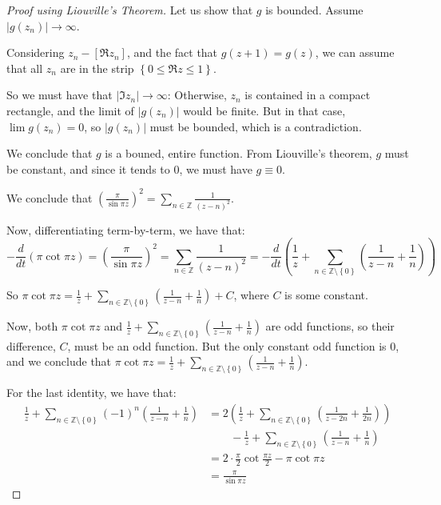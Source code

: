 \documentclass[11pt]{article} %
\theoremstyle{definition}
\theoremstyle{remark}
\newcommand{\abs}[1]{\left|#1\right|}
\begin{document}
\begin{proof}[Proof using Liouville's Theorem]
Let us show that $g$ is bounded. Assume $\abs{g\left(z_n\right)} \to \infty$.

Considering $z_n - \left[\Re z_n\right]$, and the fact that $g\left(z+1\right) = g\left(z\right)$, we can assume that all $z_n$ are in the strip $\left\{0\leq \Re z \leq 1\right\}$.

So we must have that $\abs{\Im z_n} \to \infty$: Otherwise, $z_n$ is contained in a compact rectangle, and the limit of $\abs{g\left(z_n\right)}$ would be finite. But in that case, $\lim g\left(z_n\right) = 0$, so $\abs{g\left(z_n\right)}$ must be bounded, which is a contradiction.

We conclude that $g$ is a bouned, entire function. From Liouville's theorem, $g$ must be constant, and since it tends to $0$, we must have $g \equiv 0$.

We conclude that $\left(\frac{\pi}{\sin \pi z}\right)^2 = \sum_{n\in \mathbb{Z}} \frac{1}{\left(z-n\right)^2}$.

Now, differentiating term-by-term, we have that:
\[ -\frac{d}{dt}\left(\pi\cot \pi z\right) = \left(\frac{\pi}{\sin\pi z}\right)^2 = \sum_{n\in \mathbb{Z}} \frac{1}{\left(z-n\right)^2} = -\frac{d}{dt}\left(\frac{1}{z} + \sum_{n\in\mathbb{Z}\setminus\left\{0\right\}}\left(\frac{1}{z-n}+\frac{1}{n}\right)\right)\]

So $\pi \cot \pi z = \frac{1}{z} + \sum_{n\in\mathbb{Z}\setminus\left\{0\right\}}\left(\frac{1}{z-n}+\frac{1}{n}\right) + C$, where $C$ is some constant.

Now, both $\pi \cot \pi z$ and $\frac{1}{z} + \sum_{n\in\mathbb{Z}\setminus\left\{0\right\}}\left(\frac{1}{z-n}+\frac{1}{n}\right)$ are odd functions, so their difference, $C$, must be an odd function. But the only constant odd function is $0$, and we conclude that $\pi \cot \pi z = \frac{1}{z} + \sum_{n\in\mathbb{Z}\setminus\left\{0\right\}}\left(\frac{1}{z-n}+\frac{1}{n}\right)$.

For the last identity, we have that:
\[
\begin{split}
\frac{1}{z} + \sum_{n\in\mathbb{Z}\setminus\left\{0\right\}} \left(-1\right)^n \left(\frac{1}{z-n} + \frac{1}{n}\right) & = 2\left(\frac{1}{z} + \sum_{n\in\mathbb{Z}\setminus\left\{0\right\}}\left(\frac{1}{z-2n}+\frac{1}{2n}\right)\right) \\
& \qquad - \frac{1}{z} + \sum_{n\in\mathbb{Z}\setminus\left\{0\right\}}\left(\frac{1}{z-n}+\frac{1}{n}\right) \\
& = 2\cdot\frac{\pi}{2} \cot \frac{\pi z}{2} - \pi \cot \pi z \\
& = \frac{\pi}{\sin\pi z}
\end{split}
\]

\end{proof}
\end{document}
